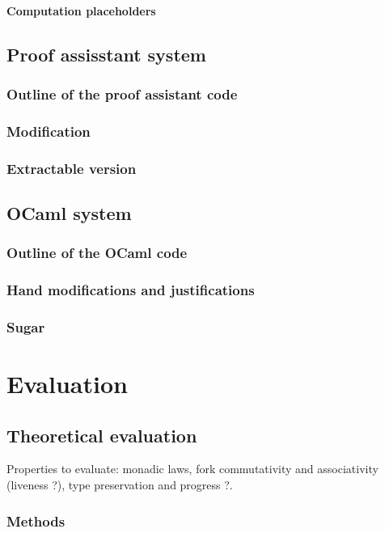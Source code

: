 \documentclass[12pt,twoside,notitlepage]{report}
\begin{document}
\subsubsection{Computation placeholders}
\section{Proof assisstant system}
\subsection{Outline of the proof assistant code}
\subsection{Modification}
\subsection{Extractable version}
\section{OCaml system}
\subsection{Outline of the OCaml code}
\subsection{Hand modifications and justifications}
\subsection{Sugar}



\cleardoublepage
\chapter{Evaluation}

\section{Theoretical evaluation}
Properties to evaluate: monadic laws, fork commutativity and associativity (liveness ?), type preservation and progress ?.

\subsection{Methods}
\end{document}
